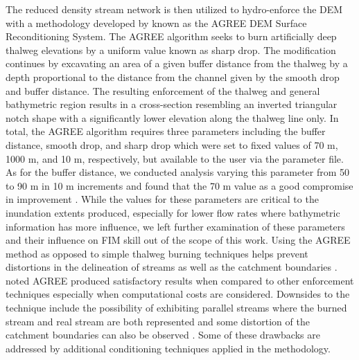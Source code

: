 The reduced density stream network is then utilized to hydro-enforce the DEM with a methodology developed by  known as the AGREE DEM Surface Reconditioning System. 
The AGREE algorithm seeks to burn artificially deep thalweg elevations by a uniform value known as sharp drop. 
The modification continues by excavating an area of a given buffer distance from the thalweg by a depth proportional to the distance from the channel given by the smooth drop and buffer distance. 
The resulting enforcement of the thalweg and general bathymetric region results in a cross-section resembling an inverted triangular notch shape with a significantly lower elevation along the thalweg line only.
In total, the AGREE algorithm requires three parameters including the buffer distance, smooth drop, and sharp drop which were set to fixed values of 70 m, 1000 m, and 10 m, respectively, but available to the user via the parameter file.
As for the buffer distance, we conducted analysis varying this parameter from 50 to 90 m in 10 m increments and found that the 70 m value as a good compromise in improvement \cite{grout2020althydrocond}.
While the values for these parameters are critical to the inundation extents produced, especially for lower flow rates where bathymetric information has more influence, we left further examination of these parameters and their influence on FIM skill out of the scope of this work.
Using the AGREE method as opposed to simple thalweg burning techniques helps prevent distortions in the delineation of streams as well as the catchment boundaries \cite{saunders1995grid,saunders1996gis,mizgalewicz1996modeling,hellweger1997agree,quenzer1998gis,baker2006comparison,grout2020althydrocond}.
 noted AGREE produced satisfactory results when compared to other enforcement techniques especially when computational costs are considered. 
Downsides to the technique include the possibility of exhibiting parallel streams where the burned stream and real stream are both represented \cite{hellweger1997agree,saunders1999preparation} and some distortion of the catchment boundaries can also be observed \cite{saunders1999preparation,saunders1996gis}.
Some of these drawbacks are addressed by additional conditioning techniques applied in the methodology.
